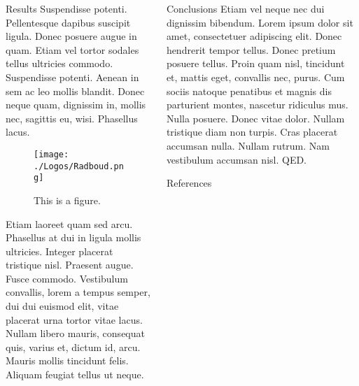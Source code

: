 \documentclass[t]{beamer}
\begin{document}
\begin{frame}[label={sec:orgafca15d}]{}
\begin{columns}
\begin{column}{0.3\columnwidth}
      \begin{block}{Results}
        Suspendisse potenti. Pellentesque dapibus suscipit ligula.  Donec posuere augue in quam.  Etiam vel tortor sodales tellus ultricies commodo.  Suspendisse potenti.  Aenean in sem ac leo mollis blandit.  Donec neque quam, dignissim in, mollis nec, sagittis eu, wisi.  Phasellus lacus.

        \begin{figure}[htbp]
          \centering
          \texttt{[image: ./Logos/Radboud.png]}
          \caption{\label{Radboud Logo}
            This is a figure.}
        \end{figure}

        Etiam laoreet quam sed arcu.  Phasellus at dui in ligula mollis ultricies.  Integer placerat tristique nisl.  Praesent augue.  Fusce commodo.  Vestibulum convallis, lorem a tempus semper, dui dui euismod elit, vitae placerat urna tortor vitae lacus.  Nullam libero mauris, consequat quis, varius et, dictum id, arcu.  Mauris mollis tincidunt felis.  Aliquam feugiat tellus ut neque.
      \end{block}
    \end{column}



    \begin{column}{0.3\columnwidth}
      \begin{block}{Conclusions}
        Etiam vel neque nec dui dignissim bibendum.  Lorem ipsum dolor sit amet, consectetuer adipiscing elit.  Donec hendrerit tempor tellus.  Donec pretium posuere tellus.  Proin quam nisl, tincidunt et, mattis eget, convallis nec, purus.  Cum sociis natoque penatibus et magnis dis parturient montes, nascetur ridiculus mus.  Nulla posuere.  Donec vitae dolor.  Nullam tristique diam non turpis.  Cras placerat accumsan nulla.  Nullam rutrum.  Nam vestibulum accumsan nisl. QED.
      \end{block}


      \begin{block}{References}
        \printbibliography
      \end{block}
    \end{column}
  \end{columns}
\end{frame}
\end{document}
